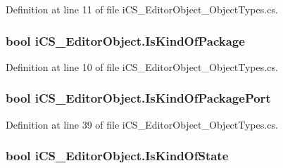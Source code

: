 Definition at line 11 of file i\+C\+S\+\_\+\+Editor\+Object\+\_\+\+Object\+Types.\+cs.

\hypertarget{classi_c_s___editor_object_a5fc4d9b2c00d9232c6f113c269bd4aa6}{
\subsubsection[{Is\+Kind\+Of\+Package}]{\setlength{\rightskip}{0pt plus 5cm}bool i\+C\+S\+\_\+\+Editor\+Object.\+Is\+Kind\+Of\+Package\hspace{0.3cm}{\ttfamily [get]}}}\label{classi_c_s___editor_object_a5fc4d9b2c00d9232c6f113c269bd4aa6}


Definition at line 10 of file i\+C\+S\+\_\+\+Editor\+Object\+\_\+\+Object\+Types.\+cs.

\hypertarget{classi_c_s___editor_object_a69e51f74a82eb628d30e03d3ed527047}{
\subsubsection[{Is\+Kind\+Of\+Package\+Port}]{\setlength{\rightskip}{0pt plus 5cm}bool i\+C\+S\+\_\+\+Editor\+Object.\+Is\+Kind\+Of\+Package\+Port\hspace{0.3cm}{\ttfamily [get]}}}\label{classi_c_s___editor_object_a69e51f74a82eb628d30e03d3ed527047}


Definition at line 39 of file i\+C\+S\+\_\+\+Editor\+Object\+\_\+\+Object\+Types.\+cs.

\hypertarget{classi_c_s___editor_object_a583deb85d2e1898dc48868aac1c49653}{
\subsubsection[{Is\+Kind\+Of\+State}]{\setlength{\rightskip}{0pt plus 5cm}bool i\+C\+S\+\_\+\+Editor\+Object.\+Is\+Kind\+Of\+State\hspace{0.3cm}{\ttfamily [get]}}}\label{classi_c_s___editor_object_a583deb85d2e1898dc48868aac1c49653}


